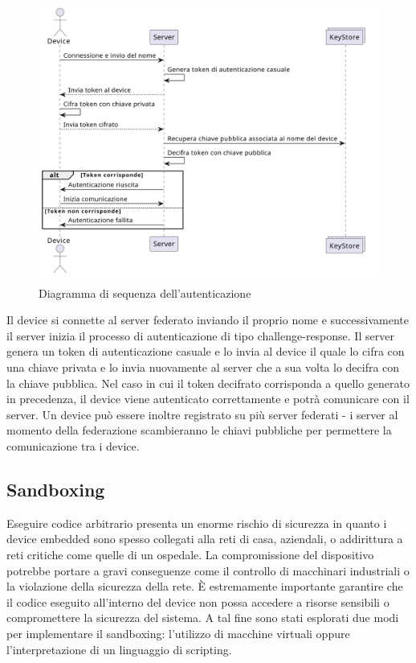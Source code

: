 \begin{figure}[H]
  \centering
  \includegraphics[width=1.0\textwidth]{images/chapter3/auth.png}
  \caption{Diagramma di sequenza dell'autenticazione}
  \label{fig:authentication_sequence}
\end{figure}

Il device si connette al server federato inviando il proprio nome e successivamente il server inizia il processo di autenticazione di tipo challenge-response.
Il server genera un token di autenticazione casuale e lo invia al device il quale lo cifra con una chiave privata e lo invia nuovamente al server che a sua volta
lo decifra con la chiave pubblica. Nel caso in cui il token decifrato corrisponda a quello generato in precedenza, il device viene autenticato correttamente e potrà comunicare con il server.
Un device può essere inoltre registrato su più server federati - i server al momento della federazione scambieranno le chiavi pubbliche per permettere la comunicazione tra i device.

\subsection{Sandboxing}

Eseguire codice arbitrario presenta un enorme rischio di sicurezza in quanto i device embedded sono spesso collegati alla reti di casa, aziendali, o addirittura a reti critiche come quelle di un ospedale.
La compromissione del dispositivo potrebbe portare a gravi conseguenze come il controllo di macchinari industriali o la violazione della sicurezza della rete.
È estremamente importante garantire che il codice eseguito all'interno del device non possa accedere a risorse sensibili o compromettere la sicurezza del sistema.
A tal fine sono stati esplorati due modi per implementare il sandboxing: l'utilizzo di macchine virtuali oppure l'interpretazione di un linguaggio di scripting.

